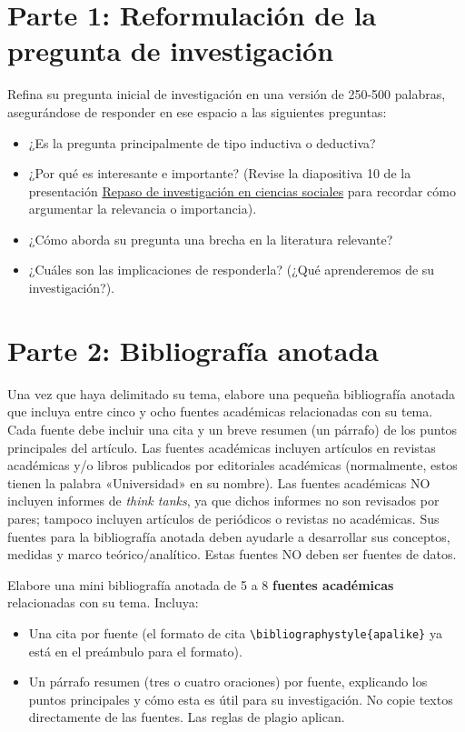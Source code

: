 \documentclass[11pt]{article}
\begin{document}
\section*{Parte 1: Reformulación de la pregunta de investigación}

Refina su pregunta inicial de investigación en una versión de 250-500 palabras, asegurándose de responder en ese espacio a las siguientes preguntas:
\begin{itemize}
    \item ¿Es la pregunta principalmente de tipo inductiva o deductiva?
    \item ¿Por qué es interesante e importante? (Revise la diapositiva 10 de la presentación \href{https://github.com/RashidCJ/SOCI-4186/blob/main/Presentaciones/Repaso%20de%20investigación%20en%20Ciencias%20Sociales.pdf}{Repaso de investigación en ciencias sociales} para recordar cómo argumentar la relevancia o importancia).
    \item ¿Cómo aborda su pregunta una brecha en la literatura relevante?
    \item ¿Cuáles son las implicaciones de responderla? (¿Qué aprenderemos de su investigación?).
\end{itemize}

\section*{Parte 2: Bibliografía anotada}

Una vez que haya delimitado su tema, elabore una pequeña bibliografía anotada que incluya entre cinco y ocho fuentes académicas relacionadas con su tema. Cada fuente debe incluir una cita y un breve resumen (un párrafo) de los puntos principales del artículo. Las fuentes académicas incluyen artículos en revistas académicas y/o libros publicados por editoriales académicas (normalmente, estos tienen la palabra «Universidad» en su nombre). Las fuentes académicas NO incluyen informes de \textit{think tanks}, ya que dichos informes no son revisados por pares; tampoco incluyen artículos de periódicos o revistas no académicas. Sus fuentes para la bibliografía anotada deben ayudarle a desarrollar sus conceptos, medidas y marco teórico/analítico. Estas fuentes NO deben ser fuentes de datos.

Elabore una mini bibliografía anotada de 5 a 8 \textbf{fuentes académicas} relacionadas con su tema. Incluya:
\begin{itemize}
    \item Una cita por fuente (el formato de cita \texttt{\textbackslash bibliographystyle\{apalike\}} ya está en el preámbulo para el formato).
    \item Un párrafo resumen (tres o cuatro oraciones) por fuente, explicando los puntos principales y cómo esta es útil para su investigación. No copie textos directamente de las fuentes. Las reglas de plagio aplican.
\end{itemize}
\end{document}
